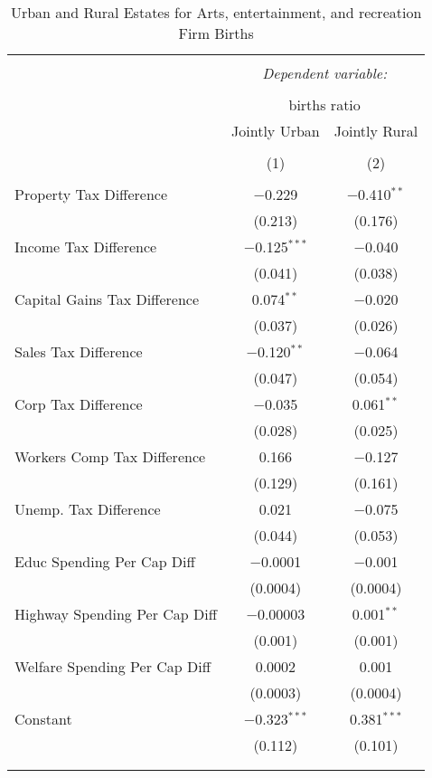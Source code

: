 
\begin{table}[!htbp] \centering 
  \caption{Urban and Rural Estates for  Arts, entertainment, and recreation Firm Births} 
  \label{} 
\begin{tabular}{@{\extracolsep{5pt}}lcc} 
\\[-1.8ex]\hline 
\hline \\[-1.8ex] 
 & \multicolumn{2}{c}{\textit{Dependent variable:}} \\ 
\cline{2-3} 
\\[-1.8ex] & \multicolumn{2}{c}{births ratio} \\ 
 & Jointly Urban & Jointly Rural \\ 
\\[-1.8ex] & (1) & (2)\\ 
\hline \\[-1.8ex] 
 Property Tax Difference & $-$0.229 & $-$0.410$^{**}$ \\ 
  & (0.213) & (0.176) \\ 
  Income Tax Difference & $-$0.125$^{***}$ & $-$0.040 \\ 
  & (0.041) & (0.038) \\ 
  Capital Gains Tax Difference & 0.074$^{**}$ & $-$0.020 \\ 
  & (0.037) & (0.026) \\ 
  Sales Tax Difference & $-$0.120$^{**}$ & $-$0.064 \\ 
  & (0.047) & (0.054) \\ 
  Corp Tax Difference & $-$0.035 & 0.061$^{**}$ \\ 
  & (0.028) & (0.025) \\ 
  Workers Comp Tax Difference & 0.166 & $-$0.127 \\ 
  & (0.129) & (0.161) \\ 
  Unemp. Tax Difference & 0.021 & $-$0.075 \\ 
  & (0.044) & (0.053) \\ 
  Educ Spending Per Cap Diff & $-$0.0001 & $-$0.001 \\ 
  & (0.0004) & (0.0004) \\ 
  Highway Spending Per Cap Diff & $-$0.00003 & 0.001$^{**}$ \\ 
  & (0.001) & (0.001) \\ 
  Welfare Spending Per Cap Diff & 0.0002 & 0.001 \\ 
  & (0.0003) & (0.0004) \\ 
  Constant & $-$0.323$^{***}$ & 0.381$^{***}$ \\ 
  & (0.112) & (0.101) \\ 
 \hline \\[-1.8ex] 
\hline 
\hline \\[-1.8ex] 
\end{tabular} 
\end{table} 
